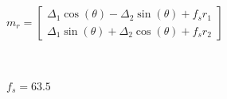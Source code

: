 \documentclass[11pt]{article}
\begin{document}
            $\displaystyle m_{r} = \left[\begin{matrix}\Delta_{1} \cos{\left(\theta \right)} - \Delta_{2} \sin{\left(\theta \right)} + f_{s} r_{1}\\\Delta_{1} \sin{\left(\theta \right)} + \Delta_{2} \cos{\left(\theta \right)} + f_{s} r_{2}\end{matrix}\right]$

            
            \begin{Verbatim}[commandchars=\\\{\}]


            \end{Verbatim}

            $\displaystyle f_{s} = 63.5$

            
            \begin{Verbatim}[commandchars=\\\{\}]


            \end{Verbatim}
\end{document}
